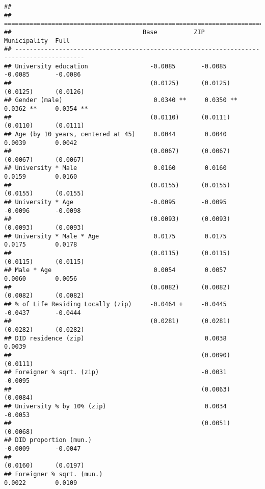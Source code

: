 \documentclass[
]{article}
\begin{document}
\begin{verbatim}
## 
## =========================================================================================
##                                    Base          ZIP           Municipality  Full        
## -----------------------------------------------------------------------------------------
## University education                 -0.0085       -0.0085       -0.0085       -0.0086   
##                                      (0.0125)      (0.0125)      (0.0125)      (0.0126)  
## Gender (male)                         0.0340 **     0.0350 **     0.0362 **     0.0354 **
##                                      (0.0110)      (0.0111)      (0.0110)      (0.0111)  
## Age (by 10 years, centered at 45)     0.0044        0.0040        0.0039        0.0042   
##                                      (0.0067)      (0.0067)      (0.0067)      (0.0067)  
## University * Male                     0.0160        0.0160        0.0159        0.0160   
##                                      (0.0155)      (0.0155)      (0.0155)      (0.0155)  
## University * Age                     -0.0095       -0.0095       -0.0096       -0.0098   
##                                      (0.0093)      (0.0093)      (0.0093)      (0.0093)  
## University * Male * Age               0.0175        0.0175        0.0175        0.0178   
##                                      (0.0115)      (0.0115)      (0.0115)      (0.0115)  
## Male * Age                            0.0054        0.0057        0.0060        0.0056   
##                                      (0.0082)      (0.0082)      (0.0082)      (0.0082)  
## % of Life Residing Locally (zip)     -0.0464 +     -0.0445       -0.0437       -0.0444   
##                                      (0.0281)      (0.0281)      (0.0282)      (0.0282)  
## DID residence (zip)                                 0.0038                      0.0039   
##                                                    (0.0090)                    (0.0111)  
## Foreigner % sqrt. (zip)                            -0.0031                     -0.0095   
##                                                    (0.0063)                    (0.0084)  
## University % by 10% (zip)                           0.0034                     -0.0053   
##                                                    (0.0051)                    (0.0068)  
## DID proportion (mun.)                                            -0.0009       -0.0047   
##                                                                  (0.0160)      (0.0197)  
## Foreigner % sqrt. (mun.)                                          0.0022        0.0109   

\end{verbatim}
\end{document}
